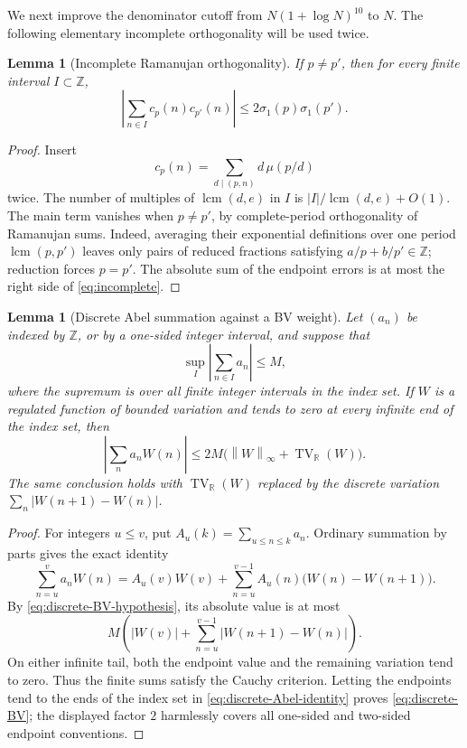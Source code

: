 \documentclass[11pt]{article}
\numberwithin{equation}{section}
\newtheorem{lemma}[theorem]{Lemma}
\theoremstyle{definition}
\newcommand{\R}{\mathbb R}
\newcommand{\Z}{\mathbb Z}
\newcommand{\1}{\mathbf 1}
\newcommand{\TV}{\operatorname{TV}}
\newcommand{\lcm}{\operatorname{lcm}}
\newcommand{\norm}[1]{\left\lVert#1\right\rVert}
\begin{document}
We next improve the denominator cutoff from
\(N(1+\log N)^{10}\) to \(N\).  The following elementary
incomplete orthogonality will be used twice.

\begin{lemma}[Incomplete Ramanujan orthogonality]\label{lem:incomplete}
If \(p\ne p'\), then for every finite interval \(I\subset\Z\),
\begin{equation}\label{eq:incomplete}
 \left|\sum_{n\in I}c_p(n)c_{p'}(n)\right|
 \le2\sigma_1(p)\sigma_1(p').
\end{equation}
\end{lemma}

\begin{proof}
Insert
\[
 c_p(n)=\sum_{d\mid(p,n)}d\,\mu(p/d)
\]
twice.  The number of multiples of \(\lcm(d,e)\) in \(I\) is
\(|I|/\lcm(d,e)+O(1)\).  The main term vanishes when
\(p\ne p'\), by complete-period orthogonality of Ramanujan sums.  Indeed,
averaging their exponential definitions over one period
\(\lcm(p,p')\) leaves only pairs of reduced fractions satisfying
\(a/p+b/p'\in\Z\); reduction forces \(p=p'\).
The absolute sum of the endpoint errors is at most the right side of
\eqref{eq:incomplete}.
\end{proof}

\begin{lemma}[Discrete Abel summation against a BV weight]
\label{lem:discrete-BV}
Let \((a_n)\) be indexed by \(\Z\), or by a one-sided integer interval,
and suppose that
\begin{equation}\label{eq:discrete-BV-hypothesis}
 \sup_I\left|\sum_{n\in I}a_n\right|\le M,
\end{equation}
where the supremum is over all finite integer intervals in the index
set.  If \(W\) is a regulated function of bounded variation and tends
to zero at every infinite end of the index set, then
\begin{equation}\label{eq:discrete-BV}
 \left|\sum_n a_nW(n)\right|
 \le 2M\bigl(\norm{W}_\infty+\TV_{\R}(W)\bigr).
\end{equation}
The same conclusion holds with \(\TV_{\R}(W)\) replaced by the
discrete variation \(\sum_n|W(n+1)-W(n)|\).
\end{lemma}

\begin{proof}
For integers \(u\le v\), put
\(A_u(k)=\sum_{u\le n\le k}a_n\).  Ordinary summation by parts gives
the exact identity
\begin{equation}\label{eq:discrete-Abel-identity}
 \sum_{n=u}^v a_nW(n)
 =A_u(v)W(v)+
  \sum_{n=u}^{v-1}A_u(n)\bigl(W(n)-W(n+1)\bigr).
\end{equation}
By \eqref{eq:discrete-BV-hypothesis}, its absolute value is at most
\[
 M\left(|W(v)|+
 \sum_{n=u}^{v-1}|W(n+1)-W(n)|\right).
\]
On either infinite tail, both the endpoint value and the remaining
variation tend to zero.  Thus the finite sums satisfy the Cauchy
criterion.  Letting the endpoints tend to the ends of the index set in
\eqref{eq:discrete-Abel-identity} proves \eqref{eq:discrete-BV}; the
displayed factor \(2\) harmlessly covers all one-sided and two-sided
endpoint conventions.
\end{proof}
\end{document}
